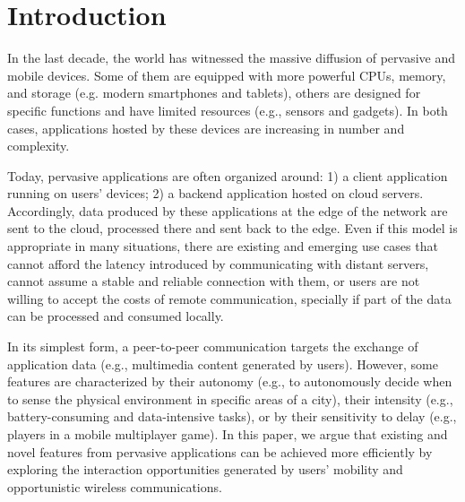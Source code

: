 \section{Introduction}
\label{sec:intro}






In the last decade, the world has witnessed the massive diffusion of pervasive and mobile devices. Some of them are equipped with more powerful CPUs, memory, and storage (e.g. modern smartphones and tablets), others are designed for specific functions and have limited resources (e.g., sensors and gadgets). In both cases, applications hosted by these devices are increasing in number and complexity. 
%

Today, pervasive applications are often organized around: 1) a client application running on users' devices; 2) a backend application hosted on cloud servers. Accordingly, data produced by these applications at the edge of the network are sent to the cloud, processed there and sent back to the edge. Even if this model is appropriate in many situations, there are existing and emerging use cases that cannot afford the latency introduced by communicating with distant servers, cannot assume a stable and reliable connection with them, or users are not willing to accept the costs of remote communication, specially if part of the data can be processed and consumed locally.

In its simplest form, a peer-to-peer communication targets the exchange of application data (e.g., multimedia content generated by users). However, some features are characterized by their autonomy 
(e.g., to autonomously decide when to sense the physical environment in specific areas of a city), their intensity (e.g., battery-consuming and data-intensive tasks), or by their sensitivity to delay (e.g., players in a mobile multiplayer game).
In this paper, we argue that existing and novel features from pervasive applications can be achieved more efficiently by exploring the interaction opportunities generated by users' mobility and opportunistic wireless communications.

